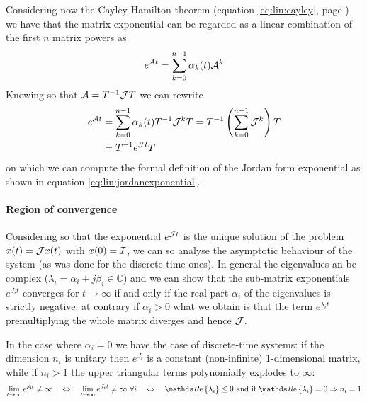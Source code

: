 		Considering now the Cayley-Hamilton theorem (equation \ref{eq:lin:cayley}, page \pageref{eq:lin:cayley}) we have that the matrix exponential can be regarded as a linear combination of the first $n$ matrix powers as
		\[ e^{\mathcal{A} t} = \sum_{k=0}^{n-1} \alpha_k(t) \mathcal{A}^k \]
		Knowing so that $\mathcal{A}= T^{-1} \mathcal{J} T$ we can rewrite
		\begin{equation} \label{eq:lin:exponentialmatrix}
		\begin{split}
			e^{\mathcal{A} t} & = \sum_{k=0}^{n-1} \alpha_k(t) T^{-1} \mathcal{J}^k T = T^{-1} \left( \sum_{k=0}^{n-1} \mathcal{J}^k \right) T \\
			& = T^{-1} e^{\mathcal{J} t} T
		\end{split}
		\end{equation}
		on which we can compute the formal definition of the Jordan form exponential as shown in equation \ref{eq:lin:jordanexponential}.
		
		\paragraph{Region of convergence} Considering so that the exponential $e^{\mathcal{J} t}$ is the unique solution of the problem $\dot x(t) = \mathcal{J} x(t)$ with $x(0) = \mathcal{I}$, we can so analyse the asymptotic behaviour of the system (as was done for the discrete-time ones). In general the eigenvalues an be complex ($\lambda_i = \alpha_i + j \beta_i \in \mathds C$) and we can show that the sub-matrix exponentials $e^{J_it}$ converges for $t\rightarrow \infty$ if and only if the real part $\alpha_i$ of the eigenvalues is strictly negative; at contrary if $\alpha_i > 0$ what we obtain is that the term $e^{\lambda_i t}$ premultiplying the whole matrix diverges and hence $\mathcal{J}$.
		
		In the case where $\alpha_i = 0$ we have the case of discrete-time systems: if the dimension $n_i$ is unitary then $e^{J_i}$ is a constant (non-infinite) 1-dimensional matrix, while if $n_i>1$ the upper triangular terms polynomially explodes to $\infty$:
		\[ \lim_{t\rightarrow\infty} e^{\A t} \neq \infty \quad \Leftrightarrow \quad \lim_{t\rightarrow\infty} e^{J_i t} \neq \infty  \  \forall i \quad \Leftrightarrow \quad \Re{\lambda_i} \leq 0 \textrm{ and if } \Re{\lambda_i} = 0 \Rightarrow n_i=1 \]
		

